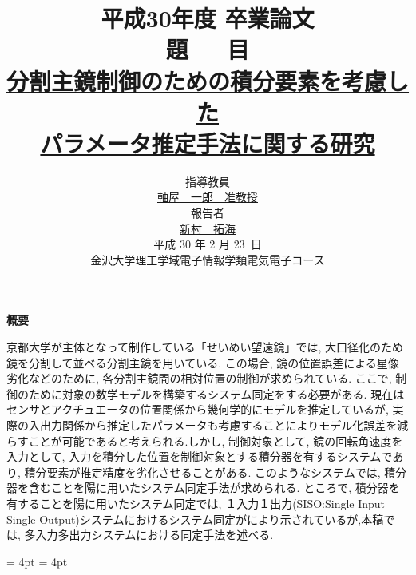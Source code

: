 \documentclass[a4paper,12pt]{jbook}
\begin{document}
{\Large
\title{
	{\bf 平成30年度 卒業論文}\\[2cm]
	{\Large 題\ \ \ 目}\\[0.5cm]
	{\underline{分割主鏡制御のための積分要素を考慮した}\\
         \underline{パラメータ推定手法に関する研究}\\
	\vspace{1cm}}}

\author{
	指導教員\\[0.2cm]  
	\underline{軸屋　一郎　准教授}\\[1.5cm]
  	{\Large 報告者}\\[0.2cm] 
	\underline{新村　拓海} \\[1.5cm]
 	平成 30 年 2 月 23\ 日\\[1.5cm]
 	金沢大学理工学域電子情報学類電気電子コース}
}
\date{}
\maketitle
\frontmatter

\begin{center} 
	{\bf \large 概要}\\[0.2cm] 
\end{center}
%
京都大学が主体となって制作している「せいめい望遠鏡」では, 大口径化のため鏡を分割して並べる分割主鏡を用いている.
この場合, 鏡の位置誤差による星像劣化などのために, 各分割主鏡間の相対位置の制御が求められている.
ここで, 制御のために対象の数学モデルを構築するシステム同定をする必要がある.
%
現在はセンサとアクチュエータの位置関係から幾何学的にモデルを推定しているが, 実際の入出力関係から推定したパラメータも考慮することによりモデル化誤差を減らすことが可能であると考えられる.しかし, 制御対象として, 鏡の回転角速度を入力として, 入力を積分した位置を制御対象とする積分器を有するシステムであり, 
積分要素が推定精度を劣化させることがある.
%
このようなシステムでは, 積分器を含むことを陽に用いたシステム同定手法が求められる.
ところで, 積分器を有することを陽に用いたシステム同定では, １入力１出力(SISO:Single Input Single Output)システムにおけるシステム同定が\cite{sysiden_a}により示されているが,本稿では, 多入力多出力システムにおける同定手法を述べる.

\tableofcontents
\abovedisplayskip = 4pt
\belowdisplayskip = 4pt
\setcounter{tocdepth}{2}
\end{document}
